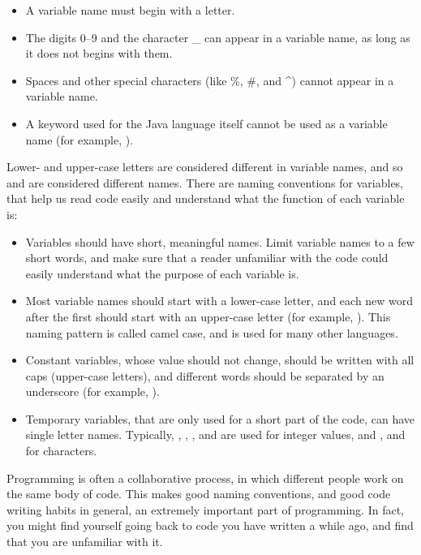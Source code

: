 \begin{itemize}
\item A variable name must begin with a letter.
\item The digits 0--9 and the character \_ can appear in a variable name, as long as it does not begins with them. 	
\item Spaces and other special characters (like \%, \#, and \textasciicircum) cannot appear in a variable name.	
\item A keyword used for the Java language itself cannot be used as a variable name (for example, ).	
\end{itemize}	
Lower- and upper-case letters are considered different in variable names, and so  and  are considered different names. There are naming conventions for variables, that help us read code easily and understand what the function of each variable is:	
\begin{itemize}	
\item Variables should have short, meaningful names. Limit variable names to a few short words, and make sure that a reader unfamiliar with the code could easily understand what the purpose of each variable is. 	
\item Most variable names should start with a lower-case letter, and each new word after the first should start with an upper-case letter (for example, ). This naming pattern is called camel case, and is used for many other languages.	
\item Constant variables, whose value should not change, should be written with all caps (upper-case letters), and different words should be separated by an underscore (for example, ).	
\item Temporary variables, that are only used for a short part of the code, can have single letter names. Typically, , , ,  and  are used for integer values, and ,  and  for characters.
\end{itemize}

Programming is often a collaborative process, in which different people work on the same body of code. This makes good naming conventions, and good code writing habits in general, an extremely important part of programming. In fact, you might find yourself going back to code you have written a while ago, and find that you are unfamiliar with it.


